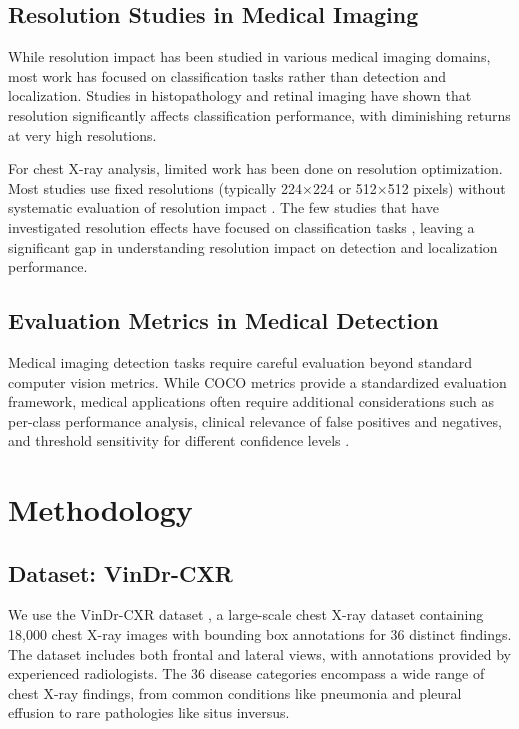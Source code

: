 \documentclass[10pt,twocolumn]{article}
\begin{document}
\subsection{Resolution Studies in Medical Imaging}

While resolution impact has been studied in various medical imaging domains, most work has focused on classification tasks rather than detection and localization. Studies in histopathology \cite{histo_resolution} and retinal imaging \cite{retinal_resolution} have shown that resolution significantly affects classification performance, with diminishing returns at very high resolutions.

For chest X-ray analysis, limited work has been done on resolution optimization. Most studies use fixed resolutions (typically 224×224 or 512×512 pixels) without systematic evaluation of resolution impact \cite{chexnet,chexpert}. The few studies that have investigated resolution effects have focused on classification tasks \cite{resolution_classification}, leaving a significant gap in understanding resolution impact on detection and localization performance.

\subsection{Evaluation Metrics in Medical Detection}

Medical imaging detection tasks require careful evaluation beyond standard computer vision metrics. While COCO metrics provide a standardized evaluation framework, medical applications often require additional considerations such as per-class performance analysis, clinical relevance of false positives and negatives, and threshold sensitivity for different confidence levels \cite{medical_eval}.

\section{Methodology}

\subsection{Dataset: VinDr-CXR}

We use the VinDr-CXR dataset \cite{vindr_cxr}, a large-scale chest X-ray dataset containing 18,000 chest X-ray images with bounding box annotations for 36 distinct findings. The dataset includes both frontal and lateral views, with annotations provided by experienced radiologists. The 36 disease categories encompass a wide range of chest X-ray findings, from common conditions like pneumonia and pleural effusion to rare pathologies like situs inversus.
\end{document}
